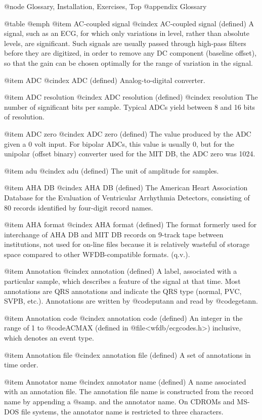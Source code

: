 {{{{{{{{@node     Glossary, Installation, Exercises, Top
@appendix Glossary

@table @emph
@item AC-coupled signal
@cindex AC-coupled signal (defined)
A signal, such as an ECG, for which only variations in level, rather
than absolute levels, are significant.  Such signals are usually passed
through high-pass filters before they are digitized, in order to remove
any DC component (baseline offset), so that the gain can be chosen
optimally for the range of variation in the signal.

@item ADC
@cindex ADC (defined)
Analog-to-digital converter.

@item ADC resolution
@cindex ADC resolution (defined)
@cindex resolution
The number of significant bits per sample.  Typical ADCs yield between 8
and 16 bits of resolution.

@item ADC zero
@cindex ADC zero (defined)
The value produced by the ADC given a 0 volt input.  For bipolar ADCs,
this value is usually 0, but for the unipolar (offset binary) converter
used for the MIT DB, the ADC zero was 1024.

@item adu
@cindex adu (defined)
The unit of amplitude for samples.

@item AHA DB
@cindex AHA DB (defined)
The American Heart Association Database for the Evaluation of Ventricular
Arrhythmia Detectors, consisting of 80 records identified by four-digit
record names.

@item AHA format
@cindex AHA format (defined)
The format formerly used for interchange of AHA DB and MIT DB records
on 9-track tape between institutions, not used for on-line files
because it is relatively wasteful of storage space compared to other
WFDB-compatible formats.  (q.v.).

@item Annotation
@cindex annotation (defined)
A label, associated with a particular sample, which describes a feature
of the signal at that time.  Most annotations are QRS annotations and
indicate the QRS type (normal, PVC, SVPB, etc.).  Annotations are
written by @code{putann} and read by @code{getann}.

@item Annotation code
@cindex annotation code (defined)
An integer in the range of 1 to @code{ACMAX} (defined in
@file{<wfdb/ecgcodes.h>}) inclusive, which denotes an event type.

@item Annotation file
@cindex annotation file (defined)
A set of annotations in time order.

@item Annotator name
@cindex annotator name (defined)
A name associated with an annotation file.  The annotation file name is
constructed from the record name by appending a @samp{.} and the annotator
name.  On CDROMs and MS-DOS file systems, the annotator name is restricted
to three characters.

}}}}}}}}
